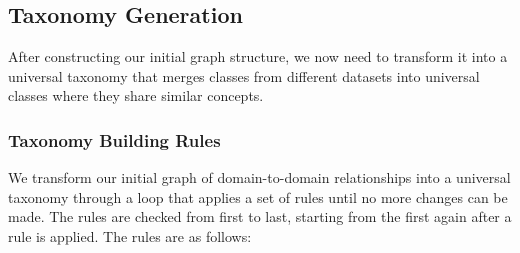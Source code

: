 \subsection{Taxonomy Generation}

After constructing our initial graph structure, we now need to transform it into a universal taxonomy
that merges classes from different datasets into universal classes where they share similar concepts.

\subsubsection{Taxonomy Building Rules}

We transform our initial graph of domain-to-domain relationships into a universal taxonomy
through a loop that applies a set of rules until no more changes can be made.
The rules are checked from first to last, starting from the first again after a rule is applied.
The rules are as follows:

